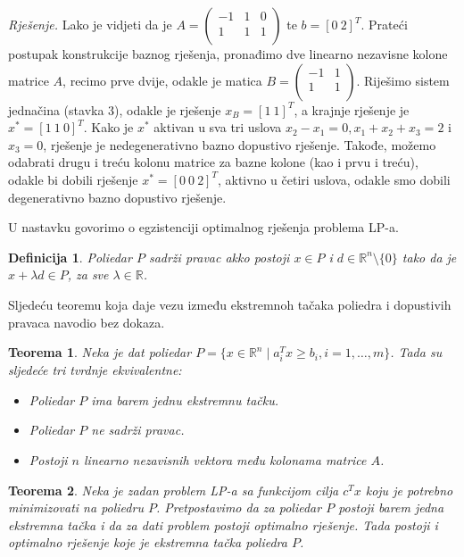 \documentclass[a4paper, utf8, 11pt, colorlinks]{book}
\newtheorem{definition}{Definicija}
\newtheorem{thm}{Teorema}
\begin{document}
\emph{Rješenje.} Lako je vidjeti da je  
$A=\left (\begin{array}{ccc}
   -1  &  1 & 0  \\
   1  &  1 & 1 \\
\end{array} \right )$ te $b = [0\ 2]^T$. Prateći postupak konstrukcije baznog rješenja, pronađimo dve linearno nezavisne kolone matrice $A$, recimo prve dvije, odakle je matica $B=\left (\begin{array}{cc}
   -1  & 1    \\
   1  &  1   \\
\end{array} \right ) .$ Riješimo sistem jednačina (stavka 3), odakle je rješenje $x_B = [1\ 1]^T$, a krajnje rješenje je $x^* = [1\ 1\ 0]^T$. Kako je 
$x^*$ aktivan u sva tri uslova $x_2 - x_1 = 0, x_1 + x_2 +  x_3 = 2$ i $x_3 = 0$, rješenje je nedegenerativno bazno dopustivo rješenje.  Takođe, možemo odabrati drugu i treću kolonu matrice za bazne kolone (kao i prvu i treću), odakle bi dobili rješenje $x^* = [0\ 0\ 2]^T$, aktivno u četiri uslova, odakle smo dobili degenerativno bazno dopustivo rješenje. 


U nastavku govorimo o egzistenciji optimalnog rješenja problema LP-a.

\begin{definition}
      Poliedar $P$ sadrži pravac akko postoji $x \in P$ i $d \in \mathbb{R}^n \setminus \{0\}$ tako da je $x + \lambda d \in P$, za sve $\lambda \in \mathbb{R}$. 
\end{definition}

Sljedeću teoremu koja daje vezu između ekstremnoh tačaka poliedra i dopustivih pravaca navodio bez dokaza.

\begin{thm}
   Neka je dat poliedar $P=\{ x \in \mathbb{R}^n  \mid a_i^T x \geq b_i, i=1,\ldots,m\} $. Tada su sljedeće tri tvrdnje ekvivalentne:
   \begin{itemize}
       \item  Poliedar $P$ ima barem jednu ekstremnu tačku.
       \item Poliedar $P$ ne sadrži pravac.
       \item Postoji $n$ linearno nezavisnih vektora  među kolonama matrice $A$. %
   \end{itemize}
\end{thm}

\begin{thm}
   Neka je zadan problem LP-a sa funkcijom cilja $c^Tx$ koju je potrebno minimizovati na poliedru $P$. Pretpostavimo da za poliedar $P$ postoji barem jedna ekstremna tačka i da za dati problem postoji optimalno rješenje. Tada postoji i optimalno rješenje koje je ekstremna tačka poliedra $P$.
\end{thm}
\end{document}
